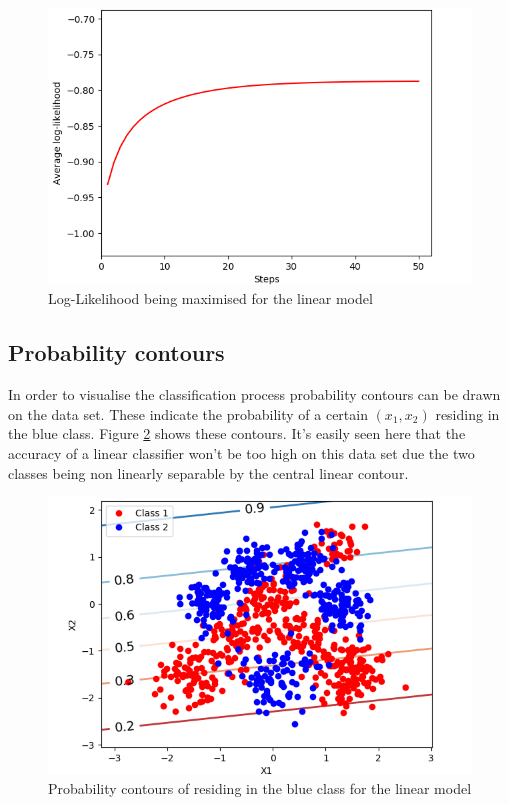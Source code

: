 \documentclass[twoside,twocolumn]{article}
\begin{document}
\begin{figure}[h]
  \centering
    \includegraphics[width=\linewidth]{linearlog}
  \caption{Log-Likelihood being maximised for the linear model}
  \label{fig:T1}
\end{figure}


\subsection{Probability contours}
In order to visualise the classification process probability contours can be drawn on the data set. These indicate the probability of a certain $(x_1,x_2)$ residing in the blue class. Figure \ref{fig:C1} shows these contours. It's easily seen here that the accuracy of a linear classifier won't be too high on this data set due the two classes being non linearly separable by the central linear contour.

\begin{figure}[h]
  \centering
    \includegraphics[width=\linewidth]{linearcontour}
  \caption{Probability contours of residing in the blue class for the linear model}
  \label{fig:C1}
\end{figure}
\end{document}
